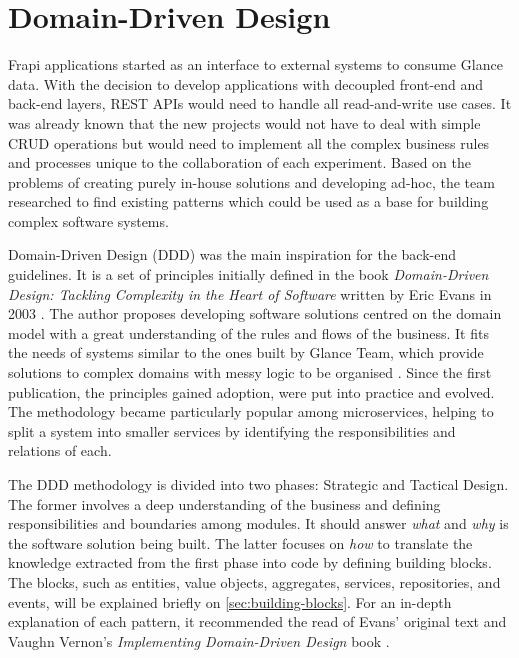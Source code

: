 \section{Domain-Driven Design}
\label{sec:ddd}

Frapi applications started as an interface to external systems to consume Glance data. With the decision to develop applications with decoupled front-end and back-end layers, REST APIs would need to handle all read-and-write use cases. It was already known that the new projects would not have to deal with simple CRUD operations but would need to implement all the complex business rules and processes unique to the collaboration of each experiment. Based on the problems of creating purely in-house solutions and developing ad-hoc, the team researched to find existing patterns which could be used as a base for building complex software systems.

Domain-Driven Design (DDD) was the main inspiration for the back-end guidelines. It is a set of principles initially defined in the book \textit{Domain-Driven Design: Tackling Complexity in the Heart of Software} written by Eric Evans in 2003 \cite{ddd-blue-book}. The author proposes developing software solutions centred on the domain model with a great understanding of the rules and flows of the business. It fits the needs of systems similar to the ones built by Glance Team, which provide solutions to complex domains with messy logic to be organised \cite{ddd-martin-folwer}. Since the first publication, the principles gained adoption, were put into practice and evolved. The methodology became particularly popular among microservices, helping to split a system into smaller services by identifying the responsibilities and relations of each.

The DDD methodology is divided into two phases: Strategic and Tactical Design. The former involves a deep understanding of the business and defining responsibilities and boundaries among modules. It should answer \textit{what} and \textit{why} is the software solution being built. The latter focuses on \textit{how} to translate the knowledge extracted from the first phase into code by defining building blocks. The blocks, such as entities, value objects, aggregates, services, repositories, and events, will be explained briefly on \autoref{sec:building-blocks}. For an in-depth explanation of each pattern, it recommended the read of Evans' original text \cite{ddd-blue-book} and Vaughn Vernon's \textit{Implementing Domain-Driven Design} book \cite{ddd-red-book}.

